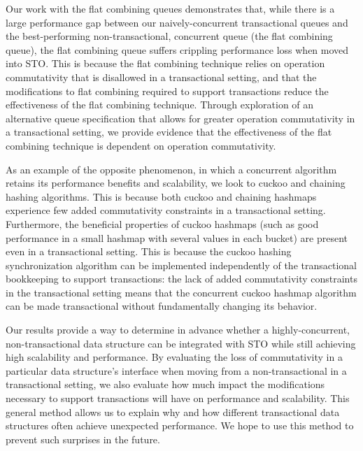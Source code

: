 Our work with the flat combining queues demonstrates that, while there is a large performance gap between our naively-concurrent transactional queues and the best-performing non-transactional, concurrent queue (the flat combining queue), the flat combining queue suffers crippling performance loss when moved into STO. This is because the flat combining technique relies on operation commutativity that is disallowed in a transactional setting, and that the modifications to flat combining required to support transactions reduce the effectiveness of the flat combining technique. Through exploration of an alternative queue specification that allows for greater operation commutativity in a transactional setting, we provide evidence that the effectiveness of the flat combining technique is dependent on operation commutativity.

As an example of the opposite phenomenon, in which a concurrent algorithm retains its performance benefits and scalability, we look to cuckoo and chaining hashing algorithms. This is because both cuckoo and chaining hashmaps experience few added commutativity constraints in a transactional setting.
Furthermore, the beneficial properties of cuckoo hashmaps (such as good performance in a small hashmap with several values in each bucket) are present even in a transactional setting. This is because the cuckoo hashing synchronization algorithm can be implemented independently of the transactional bookkeeping to support transactions: the lack of added commutativity constraints in the transactional setting means that the concurrent cuckoo hashmap algorithm can be made transactional without fundamentally changing its behavior.

Our results provide a way to determine in advance whether a highly-concurrent, non-transactional data structure can be integrated with STO while still achieving high scalability and performance. By evaluating the loss of commutativity in a particular data structure's interface when moving from a non-transactional in a transactional setting, we also evaluate how much impact the modifications necessary to support transactions will have on performance and scalability. This general method allows us to explain why and how different transactional data structures often achieve unexpected performance. We hope to use this method to prevent such surprises in the future.
